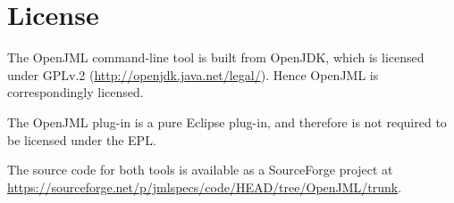 \section{License}

The OpenJML command-line tool is built from OpenJDK, which is licensed under GPLv.2 (\url{http://openjdk.java.net/legal/}).
Hence OpenJML is correspondingly licensed.

The OpenJML plug-in is a pure Eclipse plug-in, and therefore is not required to be licensed under the EPL.


The source code for both tools is available as a SourceForge project at
\url{https://sourceforge.net/p/jmlspecs/code/HEAD/tree/OpenJML/trunk}.
